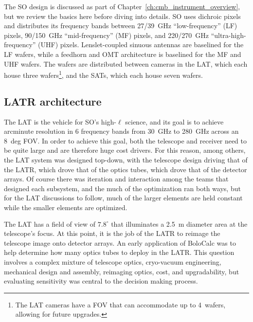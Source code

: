 The SO design is discussed as part of Chapter~\ref{ch:cmb_instrument_overview}, but we review the basics here before diving into details. SO uses dichroic pixels and distributes its frequency bands between 27/39~GHz ``low-frequency'' (LF) pixels, 90/150~GHz ``mid-frequency'' (MF) pixels, and 220/270~GHz ``ultra-high-frequency'' (UHF) pixels. Lenslet-coupled sinuous antennas are baselined for the LF wafers, while a feedhorn and OMT architecture is baselined for the MF and UHF wafers. The wafers are distributed between cameras in the LAT, which each house three wafers\footnote{The LAT cameras have a FOV that can accommodate up to 4~wafers, allowing for future upgrades.}, and the SATs, which each house seven wafers.


\subsection{LATR architecture}
\label{sec:bolocalc_latr_design}

The LAT is the vehicle for SO's high-$\ell$ science, and its goal is to achieve arcminute resolution in 6 frequency bands from 30~GHz to 280~GHz across an 8~deg FOV. In order to achieve this goal, both the telescope and receiver need to be quite large and are therefore huge cost drivers. For this reason, among others, the LAT system was designed top-down, with the telescope design driving that of the LATR, which drove that of the optics tubes, which drove that of the detector arrays. Of course there was iteration and interaction among the teams that designed each subsystem, and the much of the optimization ran both ways, but for the LAT discussions to follow, much of the larger elements are held constant while the smaller elements are optimized.

The LAT has a field of view of $7.8^{\circ}$ that illuminates a 2.5~m diameter area at the telescope's focus. At this point, it is the job of the LATR to reimage the telescope image onto detector arrays. An early application of BoloCalc was to help determine how many optics tubes to deploy in the LATR. This question involves a complex mixture of telescope optics, cryo-vacuum engineering, mechanical design and assembly, reimaging optics, cost, and upgradability, 
but evaluating sensitivity was central to the decision making process.

